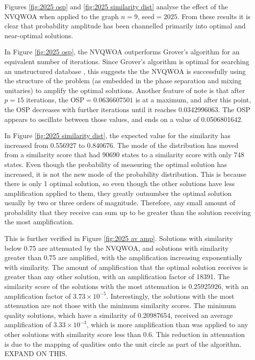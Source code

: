 Figures \ref{fig:2025 osp} and \ref{fig:2025 similarity dist} analyse the effect of the NVQWOA when applied to the graph $n=9$, seed$=2025$. From these results it is clear that probability amplitude has been channelled primarily into optimal and near-optimal solutions. 

In Figure \ref{fig:2025 osp}, the NVQWOA outperforms Grover's algorithm for an equivalent number of iterations. Since Grover's algorithm is optimal for searching an unstructured database \cite{grover_optimal}, this suggests the the NVQWOA is successfully using the structure of the problem (as embedded in the phase separation and mixing unitaries) to amplify the optimal solutions. Another feature of note is that after $p=15$ iterations, the OSP$=0.0636607501$ is at a maximum, and after this point, the OSP decreases with further iterations until it reaches 0.0342996063. The OSP appears to oscillate between those values, and ends on a value of 0.0506801642.

In Figure \ref{fig:2025 similarity dist}, the expected value for the similarity has increased from 0.556927 to 0.840676. The mode of the distribution has moved from a similarity score that had 90690 states to a similarity score with only 748 states. Even though the probability of measuring the optimal solution has increased, it is not the new mode of the probability distribution. This is because there is only 1 optimal solution, so even though the other solutions have less amplification applied to them, they greatly outnumber the optimal solution usually by two or three orders of magnitude. Therefore, any small amount of probability that they receive can sum up to be greater than the solution receiving the most amplification.

This is further verified in Figure \ref{fig:2025 av amp}. Solutions with similarity below 0.75 are attenuated by the NVQWOA, and solutions with similarity greater than 0.75 are amplified, with the amplification increasing exponentially with similarity. The amount of amplification that the optimal solution receives is greater than any other solution, with an amplification factor of 18391. The similarity score of the solutions with the most attenuation is 0.25925926, with an amplification factor of $3.73\times10^{-5}$. Interestingly, the solutions with the most attenuation are not those with the minimum similarity scores. The minimum quality solutions, which have a similarity of 0.20987654, received an average amplification of $3.33\times10^{-3}$, which is more amplification than was applied to any other solutions with similarity score less than 0.6. This reduction in attenuation is due to the mapping of qualities onto the unit circle as part of the algorithm. EXPAND ON THIS.


